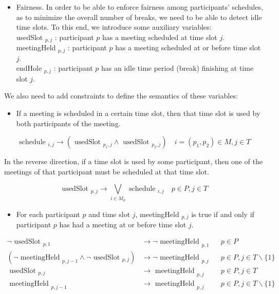 \documentclass[10pt]{article}
\begin{document}
\begin{itemize}
  \item Fairness. In order to be able to enforce fairness among participants' schedules, as to minimize the overall number of breaks, we need to be able to detect idle time slots. To this end, we introduce some auxiliary variables:\\
usedSlot $_{p, j}$ : participant $p$ has a meeting scheduled at time slot $j$.\\
meetingHeld $_{p, j}$ : participant $p$ has a meeting scheduled at or before time slot $j$.\\
endHole $_{p, j}$ : participant $p$ has an idle time period (break) finishing at time slot $j$.
\end{itemize}

We also need to add constraints to define the semantics of these variables:

\begin{itemize}
  \item If a meeting is scheduled in a certain time slot, then that time slot is used by both participants of the meeting.
\end{itemize}


\begin{equation*}
\text { schedule }_{i, j} \rightarrow\left(\text { usedSlot }_{p_{1}, j} \wedge \text { usedSlot }_{p_{2}, j}\right) \quad i=\left(p_{1}, p_{2}\right) \in M, j \in T \tag{29}
\end{equation*}


In the reverse direction, if a time slot is used by some participant, then one of the meetings of that participant must be scheduled at that time slot.


\begin{equation*}
\text { usedSlot }_{p, j} \rightarrow \bigvee_{i \in M_{p}} \text { schedule }_{i, j} \quad p \in P, j \in T \tag{30}
\end{equation*}


\begin{itemize}
  \item For each participant $p$ and time slot $j$, meetingHeld $_{p, j}$ is true if and only if participant $p$ has had a meeting at or before time slot $j$.
\end{itemize}


\begin{align*}
\neg \text { usedSlot }_{p, 1} & \rightarrow \neg \text { meetingHeld }_{p, 1} & & p \in P  \tag{31}\\
\left(\neg \text { meetingHeld }_{p, j-1} \wedge \neg \text { usedSlot }_{p, j}\right) & \rightarrow \neg \text { meetingHeld }_{p, j} & & p \in P, j \in T \backslash\{1\}  \tag{32}\\
\text { usedSlot }_{p, j} & \rightarrow \text { meetingHeld }_{p, j} & & p \in P, j \in T  \tag{33}\\
\text { meetingHeld }_{p, j-1} & \rightarrow \text { meetingHeld }_{p, j} & & p \in P, j \in T \backslash\{1\} \tag{34}
\end{align*}
\end{document}
